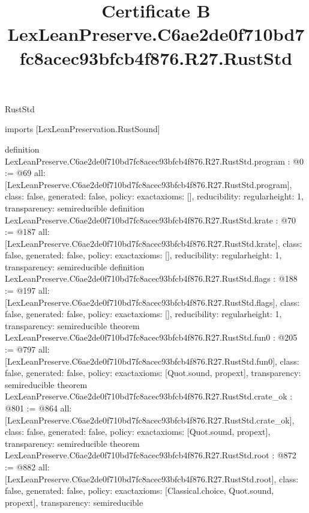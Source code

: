\begin{lexlean}{RustStd}
\title{Certificate B LexLeanPreserve.C6ae2de0f710bd7fc8acec93bfcb4f876.R27.RustStd}
\begin{coremodule}
imports [LexLeanPreservation.RustSound]

definition LexLeanPreserve.C6ae2de0f710bd7fc8acec93bfcb4f876.R27.RustStd.program : @0 := @69 {
  all: [LexLeanPreserve.C6ae2de0f710bd7fc8acec93bfcb4f876.R27.RustStd.program],
  class: false,
  generated: false,
  policy: exact{axioms: []},
  reducibility: regular{height: 1},
  transparency: semireducible
}
definition LexLeanPreserve.C6ae2de0f710bd7fc8acec93bfcb4f876.R27.RustStd.krate : @70 := @187 {
  all: [LexLeanPreserve.C6ae2de0f710bd7fc8acec93bfcb4f876.R27.RustStd.krate],
  class: false,
  generated: false,
  policy: exact{axioms: []},
  reducibility: regular{height: 1},
  transparency: semireducible
}
definition LexLeanPreserve.C6ae2de0f710bd7fc8acec93bfcb4f876.R27.RustStd.flags : @188 := @197 {
  all: [LexLeanPreserve.C6ae2de0f710bd7fc8acec93bfcb4f876.R27.RustStd.flags],
  class: false,
  generated: false,
  policy: exact{axioms: []},
  reducibility: regular{height: 1},
  transparency: semireducible
}
theorem LexLeanPreserve.C6ae2de0f710bd7fc8acec93bfcb4f876.R27.RustStd.fun0 : @205 := @797 {
  all: [LexLeanPreserve.C6ae2de0f710bd7fc8acec93bfcb4f876.R27.RustStd.fun0],
  class: false,
  generated: false,
  policy: exact{axioms: [Quot.sound, propext]},
  transparency: semireducible
}
theorem LexLeanPreserve.C6ae2de0f710bd7fc8acec93bfcb4f876.R27.RustStd.crate_ok : @801 := @864 {
  all: [LexLeanPreserve.C6ae2de0f710bd7fc8acec93bfcb4f876.R27.RustStd.crate_ok],
  class: false,
  generated: false,
  policy: exact{axioms: [Quot.sound, propext]},
  transparency: semireducible
}
theorem LexLeanPreserve.C6ae2de0f710bd7fc8acec93bfcb4f876.R27.RustStd.root : @872 := @882 {
  all: [LexLeanPreserve.C6ae2de0f710bd7fc8acec93bfcb4f876.R27.RustStd.root],
  class: false,
  generated: false,
  policy: exact{axioms: [Classical.choice, Quot.sound, propext]},
  transparency: semireducible
}


\end{coremodule}
\end{lexlean}
